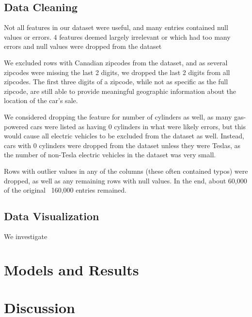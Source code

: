\documentclass[UTF8]{ctexart}
\begin{document}
        \subsection{Data Cleaning}
        Not all features in our dataset were useful, and many entries contained null values or errors. 
        4 features deemed largely irrelevant or which had too many errors and null values were dropped from the dataset

        We excluded rows with Canadian zipcodes from the dataset, and as several zipcodes were missing the last
        2 digits, we dropped the last 2 digits from all zipcodes. The first three digits of a zipcode, while 
        not as specific as the full zipcode, are still able to provide meaningful geographic information about
        the location of the car's sale.
        
        We considered dropping the feature for number of cylinders as well, as many gas-powered cars were listed as 
        having 0 cylinders in what were likely errors, but this would cause all electric vehicles to be excluded 
        from the dataset as well. Instead, cars with 0 cylinders were dropped from the dataset unless they were
        Teslas, as the number of non-Tesla electric vehicles in the dataset was very small.

        Rows with outlier values in any of the columns (these often contained typos) were dropped, as well as
        any remaining rows with null values. In the end, about 60,000 of the original ~160,000 entries remained.
        \newline
        \subsection{Data Visualization}
        We investigate
    \section{Models and Results}
    
    \section{Discussion}
\end{document}
